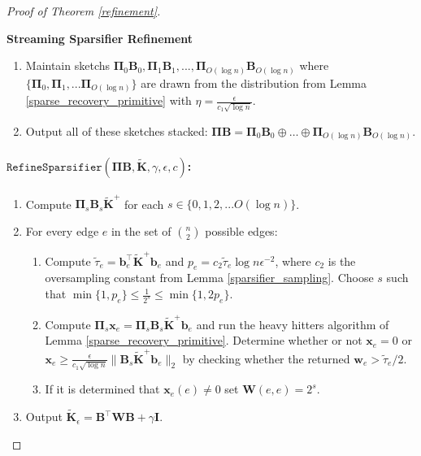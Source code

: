 \documentclass[11pt]{article}
\newcommand{\bs}[1]{\boldsymbol{#1}}
\newcommand{\bv}[1]{\mathbf{#1}}
\newcommand{\refine}{\texttt{RefineSparsifier}}
\begin{document}
\begin{proof}[Proof of Theorem \ref{refinement}]
\begin{framed}{\noindent\bfseries Streaming Sparsifier Refinement}
\begin{enumerate}
\item Maintain sketchs $\bv{\Pi}_0\bv{B}_0, \bv{\Pi}_{1}\bv{B}_{1}, ... , \bv{\Pi}_{O(\log n)}\bv{B}_{O(\log n)}$ where $\{\bv{\Pi}_0,\bv{\Pi}_1,...\bv{\Pi}_{O(\log n)} \}$ are drawn from the distribution from Lemma \ref{sparse_recovery_primitive} with $\eta = \frac{\epsilon}{c_1\sqrt{\log n}}$.
\item Output all of these sketches stacked: $\bs{\Pi}\bv{B} = \bv{\Pi}_0\bv{B}_0 \oplus \ldots \oplus \bv{\Pi}_{O(\log n)}\bv{B}_{O(\log n)}$.

\end{enumerate}

\paragraph{$\refine(\bv{\Pi}\bv{B}, \bv{\tilde K}, \gamma, \epsilon,c)$:}
\begin{enumerate}
\item Compute $\bv{\Pi}_s\bv{B}_s\bv{\tilde K}^+$ for each $s \in \{0,1,2,...O(\log n)\}$.

\item For every edge $e$ in the set of ${n \choose 2}$ possible edges:
\begin{enumerate}
\item Compute $\tilde \tau_e = \bv{b}_e^\top \bv{\tilde K}^+ \bv{b}_e$ and $p_e =  c_2\tilde \tau_e \log n \epsilon^{-2}$, where $c_2$ is the oversampling constant from Lemma \ref{sparsifier_sampling}. Choose $s$ such that $ \min \{1, p_e \} \le \frac{1}{2^s} \le \min \{1, 2 p_e \}$.

\item Compute $ \bv{\Pi}_s\bv{x}_e = \bv{\Pi}_s\bv{B}_s\bv{\tilde K}^+\bv{b}_e$ and run the heavy hitters algorithm of Lemma \ref{sparse_recovery_primitive}. Determine whether or not $\bv{x}_e = 0$ or $\bv{x}_e \geq \frac{\epsilon}{c_1\sqrt{\log n}}\|\bv{B}_s\bv{\tilde K}^+\bv{b}_e\|_2$ by checking whether the returned $\bv{w}_e > \tilde \tau_e/2$. 


\item If it is determined that $\bv{ x}_e(e) \neq 0$ set $\bv{W}(e,e) = 2^s$.

\end{enumerate}

\item Output $\bv{\tilde K}_\epsilon = \bv{B}^\top \bv{W} \bv{B} + \gamma \bv{I}$.
\end{enumerate}
\end{framed}


\end{proof}
\end{document}
